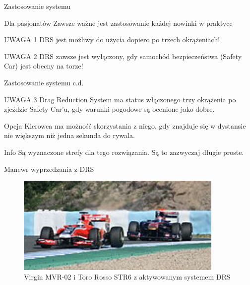 \documentclass{beamer}
\begin{document}
\begin{frame}{Zastosowanie systemu}
\centering
\begin{block}{Dla pasjonatów}
Zawsze ważne jest zastosowanie każdej nowinki w praktyce
\end{block}
\begin{alertblock}{UWAGA 1}
DRS jest możliwy do użycia dopiero po trzech okrążeniach!
\end{alertblock}
\begin{alertblock}{UWAGA 2}
DRS zawsze jest wyłączony, gdy samochód bezpieczeństwa (Safety Car) jest obecny na torze!
\end{alertblock}
\end{frame}

\begin{frame}{Zastosowanie systemu c.d.}
\centering
\begin{alertblock}{UWAGA 3}
Drag Reduction System ma status włączonego trzy okrążenia po zjeździe Safety Car'u, gdy warunki pogodowe są ocenione jako dobre.
\end{alertblock}
\begin{exampleblock}{Opcja}
Kierowca ma możność skorzystania z niego, gdy znajduje się w dystansie nie większym niż jedna sekunda do rywala.
\end{exampleblock}
\begin{block}{Info}
Są wyznaczone strefy dla tego rozwiązania. Są to zazwyczaj długie proste.
\end{block}
\end{frame}

\begin{frame}{Manewr wyprzedzania z DRS}
\begin{figure}[h]
\centering
\includegraphics[width=10cm]{./images/DRS2}
\caption[2]{Virgin MVR-02 i Toro Rosso STR6 z aktywowanym systemem DRS}
\end{figure}
\end{frame}
\end{document}
